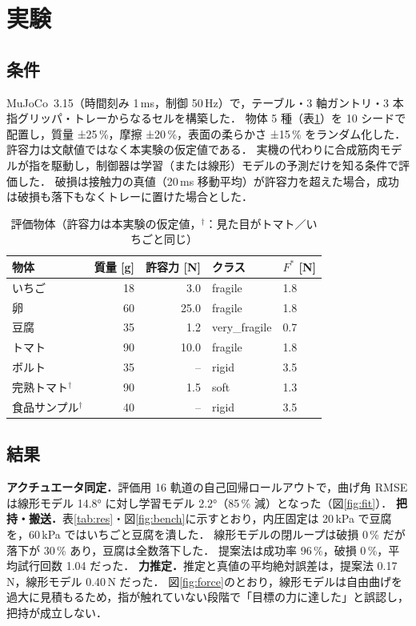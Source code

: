 \documentclass[a4paper,twocolumn,10pt]{ltjsarticle}
\begin{document}
\section{実験}
\subsection{条件}
MuJoCo~3.15\cite{todorov2012}（時間刻み 1\,ms，制御 50\,Hz）で，テーブル・3 軸ガントリ・3 本指グリッパ・トレーからなるセルを構築した．
物体 5 種（表\ref{tab:obj}）を 10 シードで配置し，質量 ±25\,\%，摩擦 ±20\,\%，表面の柔らかさ ±15\,\% をランダム化した．
許容力は文献値ではなく本実験の仮定値である．
実機の代わりに合成筋肉モデルが指を駆動し，制御器は学習（または線形）モデルの予測だけを知る条件で評価した．
破損は接触力の真値（20\,ms 移動平均）が許容力を超えた場合，成功は破損も落下もなくトレーに置けた場合とした．

\begin{table}[t]
\centering\small
\caption{評価物体（許容力は本実験の仮定値，$^\dagger$：見た目がトマト／いちごと同じ）}
\label{tab:obj}
\begin{tabular}{@{}lrrll@{}}
\toprule
物体 & 質量 [g] & 許容力 [N] & クラス & $F^*$ [N] \\
\midrule
いちご & 18 & 3.0 & fragile & 1.8 \\
卵 & 60 & 25.0 & fragile & 1.8 \\
豆腐 & 35 & 1.2 & very\_fragile & 0.7 \\
トマト & 90 & 10.0 & fragile & 1.8 \\
ボルト & 35 & -- & rigid & 3.5 \\
\midrule
完熟トマト$^\dagger$ & 90 & 1.5 & soft & 1.3 \\
食品サンプル$^\dagger$ & 40 & -- & rigid & 3.5 \\
\bottomrule
\end{tabular}
\end{table}

\subsection{結果}
\textbf{アクチュエータ同定．}評価用 16 軌道の自己回帰ロールアウトで，曲げ角 RMSE は線形モデル 14.8° に対し学習モデル 2.2°（85\,\% 減）となった（図\ref{fig:fit}）．
\textbf{把持・搬送．}表\ref{tab:res}・図\ref{fig:bench}に示すとおり，内圧固定は 20\,kPa で豆腐を，60\,kPa ではいちごと豆腐を潰した．
線形モデルの閉ループは破損 0\,\% だが落下が 30\,\% あり，豆腐は全数落下した．
提案法は成功率 96\,\%，破損 0\,\%，平均試行回数 1.04 だった．
\textbf{力推定．}推定と真値の平均絶対誤差は，提案法 0.17\,N，線形モデル 0.40\,N だった．
図\ref{fig:force}のとおり，線形モデルは自由曲げを過大に見積もるため，指が触れていない段階で「目標の力に達した」と誤認し，把持が成立しない．
\end{document}
